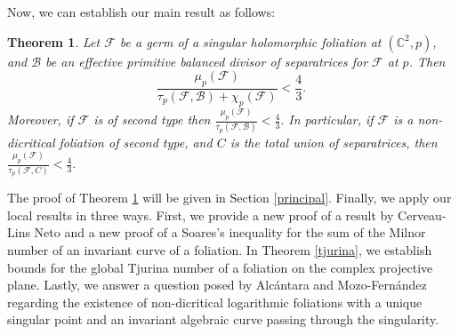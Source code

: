 \documentclass[11pt]{amsart}
\newcommand{\C}{\mathbb{C}}
\newcommand{\F}{\mathcal{F}}
\newcommand{\B}{\mathcal{B}}
\newtheorem{maintheorem}{Theorem}
\begin{document}
\par Now, we can establish our main result as follows:  
\begin{maintheorem}\label{DG}
Let $\F$ be a germ of a singular holomorphic foliation  at $(\C^2,p)$, and $\B$ be an effective primitive balanced divisor of separatrices for $\F$ at $p$.  
  Then
    \[
    \frac{\mu_{p}(\mathcal{F})}{\tau_{p}(\mathcal{F},\mathcal{B})+\chi_{p}(\mathcal{F})}<\frac{4}{3}.
    \] 
Moreover, if  $\mathcal{F}$ is of second type then
$\frac{\mu_{p}(\mathcal{F})}{\tau_{p}(\mathcal{F},\mathcal{B})}<\frac{4}{3}.$ In particular,  if  $\mathcal{F}$ is a non-dicritical foliation of second type, and $C$ is the total union of separatrices, then $\frac{\mu_{p}(\mathcal{F})}{\tau_{p}(\mathcal{F},C)}<\frac{4}{3}.$
\end{maintheorem}
The proof of Theorem \ref{DG} will be given in Section \ref{principal}.
Finally, we apply our local results in three ways. First, we provide a new proof of a result by Cerveau-Lins Neto \cite[Proposition \ref{prop_cl}]{Cerveau-LN} and a new proof of a Soares's inequality \cite[Theorem \ref{Soares ine}]{Soares} for the sum of the Milnor number of an invariant curve of a foliation. In Theorem \ref{tjurina}, we establish bounds for the global Tjurina number of a foliation on the complex projective plane. Lastly, we answer a question posed by Alc\'antara and Mozo-Fern\'andez \cite[p. 16]{Alcantara} regarding the existence of non-dicritical logarithmic foliations with a unique singular point and an invariant algebraic curve passing through the singularity.
\end{document}
